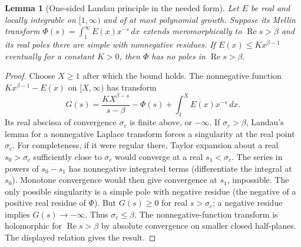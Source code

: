 \documentclass[11pt]{article}
\newtheorem{lemma}[theorem]{Lemma}
\theoremstyle{remark}\newtheorem{remark}[theorem]{Remark}
\DeclareMathOperator{\Ree}{Re}
\begin{document}
\begin{lemma}[One-sided Landau principle in the needed form]\label{lem:landau}
Let $E$ be real and locally integrable on $[1,\infty)$ and of at most
polynomial growth. Suppose its Mellin transform $\Phi(s)=\int_1^\infty
E(x)x^{-s}\,dx$ extends meromorphically to $\Ree s>\beta$ and its real
poles there are simple with nonnegative residues. If
$E(x)\le Kx^{\beta-1}$ eventually for a constant $K>0$, then $\Phi$
has no poles in $\Ree s>\beta$.
\end{lemma}
\begin{proof}
Choose $X\ge1$ after which the bound holds. The nonnegative function
$Kx^{\beta-1}-E(x)$ on $[X,\infty)$ has transform
\[
 G(s)=\frac{KX^{\beta-s}}{s-\beta}-\Phi(s)+\int_1^X E(x)x^{-s}\,dx.
\]
Its real abscissa of convergence $\sigma_c$ is finite above, or
$-\infty$. If $\sigma_c>\beta$, Landau's lemma for a nonnegative
Laplace transform forces a singularity at the real point $\sigma_c$.
For completeness, if it were regular there, Taylor expansion about a
real $s_0>\sigma_c$ sufficiently close to $\sigma_c$ would converge
at a real $s_1<\sigma_c$. The series in powers of $s_0-s_1$ has
nonnegative integrated terms (differentiate the integral at $s_0$).
Monotone convergence would then give convergence at $s_1$, impossible.
The only possible singularity is a simple pole with negative residue
(the negative of a positive real residue of $\Phi$). But $G(s)\ge0$
for real $s>\sigma_c$; a negative residue implies $G(s)\to-\infty$.
Thus $\sigma_c\le\beta$. The nonnegative-function transform is
holomorphic for $\Ree s>\beta$ by absolute convergence on smaller
closed half-planes. The displayed relation gives the result.
\end{proof}
\end{document}
